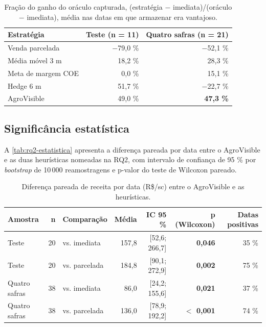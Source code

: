 \begin{table}[htb]
	\centering
	\caption{Fração do ganho do oráculo capturada, (estratégia $-$ imediata)/(oráculo $-$ imediata), média nas datas em que armazenar era vantajoso.}\label{tab:rq2-oraculo}
	\begin{tabular}{l r r}
		\hline
		\textbf{Estratégia} & \textbf{Teste (n = 11)} & \textbf{Quatro safras (n = 21)} \\ \hline
		Venda parcelada & $-$79,0 \% & $-$52,1 \% \\
		Média móvel 3 m & 18,2 \% & 28,3 \% \\
		Meta de margem COE & 0,0 \% & 15,1 \% \\
		Hedge 6 m & 51,7 \% & $-$22,7 \% \\
		AgroVisible & 49,0 \% & \textbf{47,3 \%} \\ \hline
	\end{tabular}
\end{table}

\subsection{Significância estatística}

A \autoref{tab:rq2-estatistica} apresenta a diferença pareada por data entre o AgroVisible e as duas heurísticas nomeadas na RQ2, com intervalo de confiança de 95 \% por \textit{bootstrap} de 10\,000 reamostragens e p-valor do teste de Wilcoxon pareado.

\begin{table}[htb]
	\centering
	\caption{Diferença pareada de receita por data (R\$/sc) entre o AgroVisible e as heurísticas.}\label{tab:rq2-estatistica}
	\footnotesize
	\setlength{\tabcolsep}{3.5pt}
	\begin{tabular}{l r l r r r r}
		\hline
		\textbf{Amostra} & \textbf{n} & \textbf{Comparação} & \textbf{Média} & \textbf{IC 95 \%} & \textbf{p (Wilcoxon)} & \textbf{Datas positivas} \\ \hline
		Teste & 20 & vs. imediata  & 157,8 & [52,6; 266,7] & \textbf{0,046} & 35 \% \\
		Teste & 20 & vs. parcelada & 184,8 & [90,1; 272,9] & \textbf{0,002} & 75 \% \\
		Quatro safras & 38 & vs. imediata  & 86,0 & [24,2; 155,6] & \textbf{0,021} & 37 \% \\
		Quatro safras & 38 & vs. parcelada & 136,0 & [78,9; 192,2] & \textbf{$<$ 0,001} & 74 \% \\ \hline
	\end{tabular}
\end{table}

